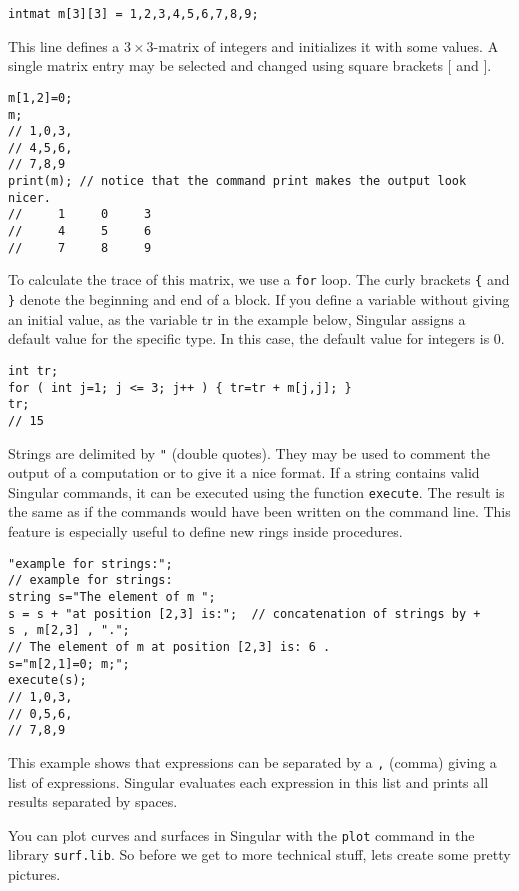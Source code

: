\documentclass[12pt]{amsart}
\begin{document}
\begin{verbatim}
intmat m[3][3] = 1,2,3,4,5,6,7,8,9;
\end{verbatim}

This line defines a $3\times 3$-matrix of integers and initializes it with some values.
A single matrix entry may be selected and changed using square brackets $[$ and $]$.

\begin{verbatim}
m[1,2]=0;
m;
// 1,0,3,
// 4,5,6,
// 7,8,9
print(m); // notice that the command print makes the output look nicer.
//     1     0     3
//     4     5     6
//     7     8     9
\end{verbatim}

To calculate the trace of this matrix, we use a \verb+for+ loop. 
The curly brackets \verb+{+ and \verb+}+ denote the beginning and end of a block. 
If you define a variable without giving an initial value, as the variable 
tr in the example below, Singular assigns a default value for the specific type. 
In this case, the default value for integers is 0. 

\begin{verbatim}
int tr;
for ( int j=1; j <= 3; j++ ) { tr=tr + m[j,j]; }
tr;
// 15
\end{verbatim}


Strings are delimited by \verb+"+ (double quotes). They may be used to comment 
the output of a computation or to give it a nice format. 
If a string contains valid Singular commands, it can be executed using the function 
\texttt{execute}. The result is the same as if the commands would have been 
written on the command line. This feature is especially useful to define new rings inside procedures.

\begin{verbatim}
"example for strings:";
// example for strings:
string s="The element of m ";
s = s + "at position [2,3] is:";  // concatenation of strings by +
s , m[2,3] , ".";
// The element of m at position [2,3] is: 6 .
s="m[2,1]=0; m;";
execute(s);
// 1,0,3,
// 0,5,6,
// 7,8,9
\end{verbatim}

This example shows that expressions can be separated by a \verb+,+ (comma) 
giving a list of expressions. Singular evaluates each expression in this list and prints all results separated by spaces.


You can plot curves and surfaces in Singular with the \texttt{plot} command in 
the library \texttt{surf.lib}. So before we get to more technical stuff, 
lets create some pretty pictures.  
\end{document}
